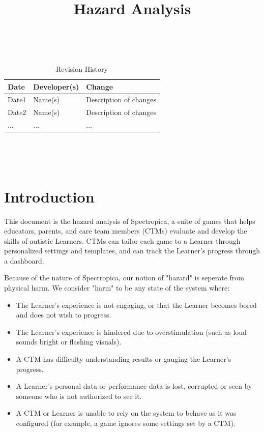 \documentclass{article}
\title{Hazard Analysis\\\progname}
\author{\authname}
\date{}
\begin{document}
\maketitle
\thispagestyle{empty}

~\newpage


\begin{table}[hp]
\caption{Revision History} \label{TblRevisionHistory}
\begin{tabularx}{\textwidth}{llX}
\toprule
\textbf{Date} & \textbf{Developer(s)} & \textbf{Change}\\
\midrule
Date1 & Name(s) & Description of changes\\
Date2 & Name(s) & Description of changes\\
... & ... & ...\\
\bottomrule
\end{tabularx}
\end{table}

~\newpage

\tableofcontents

~\newpage


\section{Introduction}

This document is the hazard analysis of Spectropica, a suite of games that helps educators, parents, and care team members (CTMs) evaluate and develop the skills of autistic Learners. CTMs can tailor each game to a Learner through personalized settings and templates, and can track the Learner's progress through a dashboard.

Because of the nature of Spectropica, our notion of "hazard" is seperate from physical harm. We consider "harm" to be any state of the system where:

\begin{itemize}
    \item The Learner's experience is not engaging, or that the Learner becomes bored and does not wish to progress.
    \item The Learner's experience is hindered due to overstimulation (such as loud sounds bright or flashing visuals).
    \item A CTM has difficulty understanding results or gauging the Learner's progress.
    \item A Learner's personal data or performance data is lost, corrupted or seen by someone who is not authorized to see it.
    \item A CTM or Learner is unable to rely on the system to behave as it was configured (for example, a game ignores some settings set by a CTM).
\end{itemize}
\end{document}
